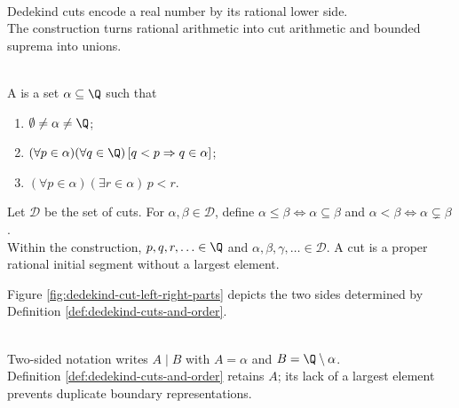 \begin{motivation} \label{mot:dedekind-construction-as-completeness-proof} \\
Dedekind cuts encode a real number by its rational lower side.\\
The construction turns rational arithmetic into cut arithmetic and bounded suprema into unions.
\end{motivation}

\begin{definition} \label{def:dedekind-cuts-and-order} \\
A  is a set $\alpha\subseteq\Q$ such that
\begin{enumerate}[label=(\roman*)]
\setlength{\itemsep}{0pt}
\item $\emptyset\neq\alpha\neq\Q$;
\item $(\forall p\in\alpha)(\forall q\in\Q)\,[q<p\Rightarrow q\in\alpha]$;
\item $(\forall p\in\alpha)(\exists r\in\alpha)\,p<r$.
\end{enumerate}
Let $\mathscr{D}$ be the set of cuts. For $\alpha,\beta\in\mathscr{D}$, define $\alpha\leq\beta\Longleftrightarrow\alpha\subseteq\beta$ and $\alpha<\beta\Longleftrightarrow\alpha\subsetneq\beta$.\\
Within the construction, $p,q,r,\ldots\in\Q$ and $\alpha,\beta,\gamma,\ldots\in\mathscr{D}$. A cut is a proper rational initial segment without a largest element.
\end{definition}

\begin{illustrationfigure}[H]
  \centering
  
  \caption{A Dedekind cut splits $\Q$ into $\alpha$ and $\Q\setminus\alpha$, with no last rational in $\alpha$.}
  \label{fig:dedekind-cut-left-right-parts}
\end{illustrationfigure}
Figure \ref{fig:dedekind-cut-left-right-parts} depicts the two sides determined by Definition \ref{def:dedekind-cuts-and-order}.
 
\begin{remark} \label{rem:left-cut-versus-two-sided-cut} \\
Two-sided notation writes $A\mid B$ with $A=\alpha$ and $B=\Q\setminus\alpha$.\\
Definition \ref{def:dedekind-cuts-and-order} retains $A$; its lack of a largest element prevents duplicate boundary representations.
\end{remark}

